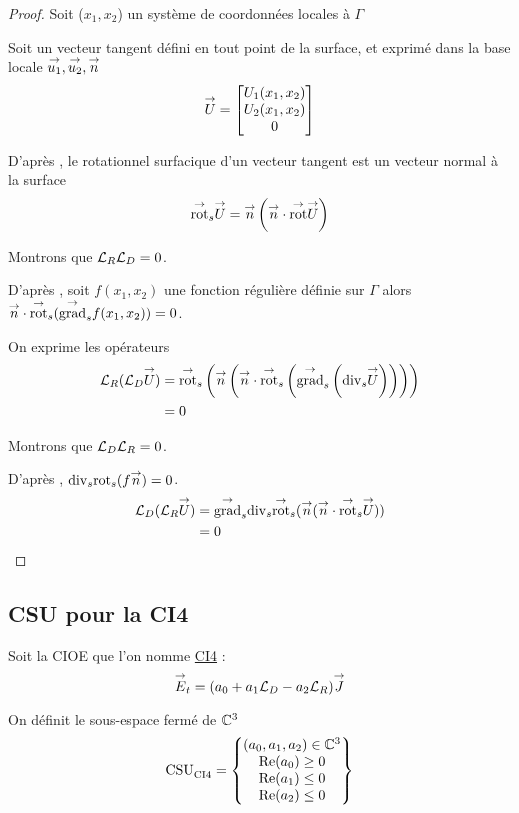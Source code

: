   \begin{proof}
    Soit (\(x_1,x_2\)) un système de coordonnées locales à \(\Gamma\)

    Soit un vecteur tangent défini en tout point de la surface, et exprimé dans la base locale \(\vect{u_1},\vect{u_2},\vect{n}\)
    \[
      \vect{U} = 
      \begin{bmatrix}
        U_1(x_1,x_2)
        \\
        U_2(x_1,x_2)
        \\
        0
      \end{bmatrix}
    \]

    D'après \cite[p.~1028, A3.22]{bladel_electromagnetic_2007}, le rotationnel surfacique d'un vecteur tangent est un vecteur normal à la surface
    \[
      \tvrots{\vect{U}} =\vn \left(\vn\cdot\trot{\vect{U}}\right)
    \]

    Montrons que \(\LR\LD = 0\).

    D’après \cite[p.~1029, A3.42]{bladel_electromagnetic_2007}, soit \(f(x_1,x_2)\) une fonction régulière définie sur \(\Gamma\) alors \(\vn \cdot \tvrots(\tgrads f(x_1,x_2)) = 0\).

    On exprime les opérateurs
    \begin{align*}
      \LR(\LD \vect U)  &= \tvrots \left(\vn \left(\vn \cdot \tvrots \left( \tgrads \left(\tdivs \vect U\right)\right)\right)\right) \\
      &= 0
    \end{align*}

    Montrons que \(\LD\LR = 0\).

    D’après \cite[p.~1029, A3.43]{bladel_electromagnetic_2007}, \(\tdivs \trots (f\vn) = 0\).
    \begin{align*}
      \LD(\LR \vect U) &= \tgrads \tdivs \tvrots (\vn (\vn \cdot \tvrots \vect U)) \\
      &= 0
    \end{align*}
  \end{proof}

\subsection{CSU pour la CI4}
  Soit la CIOE que l'on nomme \hyperlink{ci4}{CI4} :
  \begin{equation}
    \label{eq:unicite:ci4:ci4}
    \vE_t = (a_0 + a_1 \LD - a_2 \LR ) \vJ
  \end{equation}

  \begin{defn}
    \label{def:csu:ci4}

    On définit le sous-espace fermé de \(\CC^3\)
    \begin{equation*}
      \CSU{CI4} = \left\lbrace 
      \begin{matrix}
      (a_0,a_1,a_2) \in \CC^3
      \\
      \Re(a_0) \ge 0
      \\
      \Re(a_1) \le 0
      \\
      \Re(a_2) \le 0
      \end{matrix}
      \right\rbrace
    \end{equation*}
  \end{defn}

